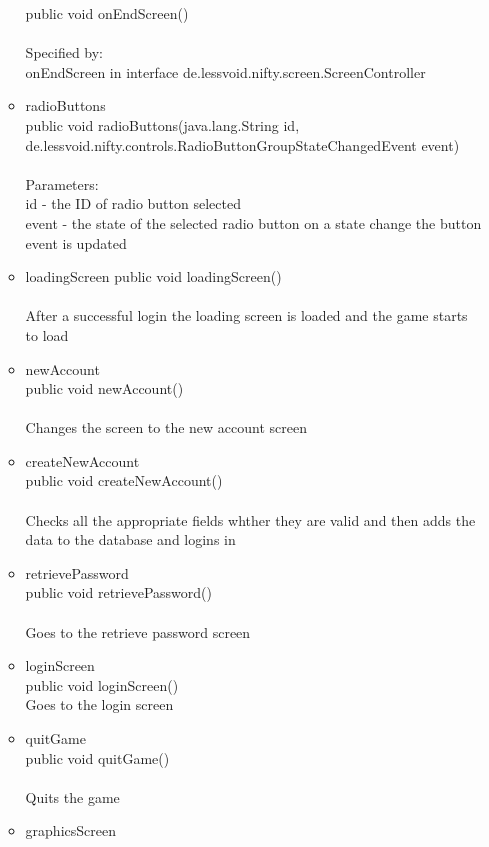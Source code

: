 \documentclass[letterpaper]{article}
\begin{document}
\begin{itemize}
\begin{itemize}
										public void onEndScreen() \\ \\
										Specified by: \\
										onEndScreen in interface de.lessvoid.nifty.screen.ScreenController
								\item	radioButtons \\
										public void radioButtons(java.lang.String id, de.lessvoid.nifty.controls.RadioButtonGroupStateChangedEvent event) \\ \\
										Parameters: \\
										id - the ID of radio button selected \\
										event - the state of the selected radio button on a state change the button event is updated
								\item	loadingScreen
										public void loadingScreen() \\ \\
										After a successful login the loading screen is loaded and the game starts to load
								\item	newAccount \\
										public void newAccount() \\ \\
										Changes the screen to the new account screen
								\item	createNewAccount \\
										public void createNewAccount() \\ \\
										Checks all the appropriate fields whther they are valid and then adds the data to the database and logins in
								\item	retrievePassword \\
										public void retrievePassword() \\ \\
										Goes to the retrieve password screen
								\item	loginScreen \\
										public void loginScreen() \\
										Goes to the login screen
								\item	quitGame \\
										public void quitGame() \\ \\
										Quits the game
								\item	graphicsScreen \\

\end{itemize}
\end{itemize}
\end{document}
